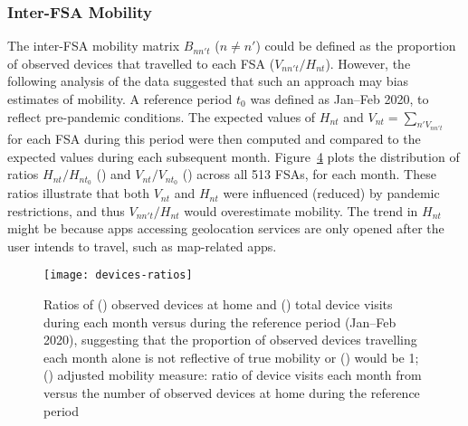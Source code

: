 \subsubsection{Inter-FSA Mobility}\label{app.mob.inter}
The inter-FSA mobility matrix $B_{nn't}$ ($n \ne n'$) could be defined as
the proportion of observed devices that travelled to each FSA ($V_{nn't} / H_{nt}$).
However, the following analysis of the data suggested that such an approach may bias estimates of mobility.
A reference period $t_0$ was defined as Jan--Feb 2020, to reflect pre-pandemic conditions.
The expected values of $H_{nt}$ and $V_{nt} = \sum_{n' V_{nn't}}$ for each FSA during this period were then
computed and compared to the expected values during each subsequent month.
Figure~\ref{fig:RHVt} plots the distribution of ratios
$H_{nt} / H_{nt_0}$ () and $V_{nt} / V_{nt_0}$ ()
across all 513 FSAs, for each month.
These ratios illustrate that both $V_{nt}$ and $H_{nt}$ were influenced (reduced) by pandemic restrictions,
and thus $V_{nn't} / H_{nt}$ would overestimate mobility.
The trend in $H_{nt}$ might be because apps accessing geolocation services are only opened
after the user intends to travel, such as map-related apps.
\begin{figure}
  \centering
  \begin{subfigure}{0pt}\label{fig:RHt}\end{subfigure}%
  \begin{subfigure}{0pt}\label{fig:RVt}\end{subfigure}%
  \begin{subfigure}{0pt}\label{fig:RH0Vt}\end{subfigure}%
  \texttt{[image: devices-ratios]}
  \caption{Ratios of () observed devices at home
    and () total device visits
    during each month versus during the reference period (Jan--Feb 2020),
    suggesting that the proportion of observed devices travelling each month
    alone is not reflective of true mobility or () would be 1;
    () adjusted mobility measure: ratio of
    device visits each month from versus
    the number of observed devices at home during the reference period}
  \label{fig:RHVt}
\end{figure}
\par
